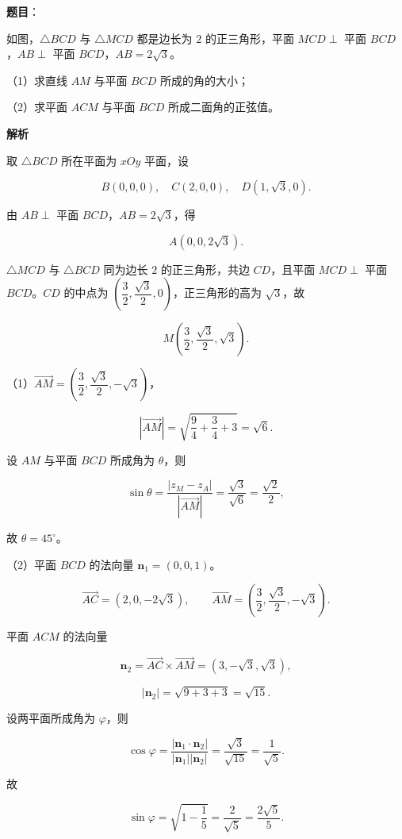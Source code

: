 \begin{answer}

\textbf{题目}：

如图，$\triangle BCD$ 与 $\triangle MCD$ 都是边长为 $2$ 的正三角形，平面 $MCD\perp$ 平面 $BCD$，$AB\perp$ 平面 $BCD$，$AB=2\sqrt3$。

（1）求直线 $AM$ 与平面 $BCD$ 所成的角的大小；

（2）求平面 $ACM$ 与平面 $BCD$ 所成二面角的正弦值。
\nopagebreak[4]
\begin{center}\end{center}
\nopagebreak[4]
\textbf{解析}

取 $\triangle BCD$ 所在平面为 $xOy$ 平面，设

\nopagebreak[4]
\[B(0,0,0),\quad C(2,0,0),\quad D(1,\sqrt3,0).\]

由 $AB\perp$ 平面 $BCD$，$AB=2\sqrt3$，得

\nopagebreak[4]
\[A(0,0,2\sqrt3).\]

$\triangle MCD$ 与 $\triangle BCD$ 同为边长 $2$ 的正三角形，共边 $CD$，且平面 $MCD\perp$ 平面 $BCD$。$CD$ 的中点为 $\left(\dfrac32,\dfrac{\sqrt3}2,0\right)$，正三角形的高为 $\sqrt3$，故

\nopagebreak[4]
\[M\left(\frac32,\frac{\sqrt3}2,\sqrt3\right).\]

（1）$\overrightarrow{AM}=\left(\dfrac32,\dfrac{\sqrt3}2,-\sqrt3\right)$，

\nopagebreak[4]
\[|\overrightarrow{AM}|=\sqrt{\frac94+\frac34+3}=\sqrt6.\]

设 $AM$ 与平面 $BCD$ 所成角为 $\theta$，则

\nopagebreak[4]
\[\sin\theta=\frac{|z_M-z_A|}{|\overrightarrow{AM}|}
=\frac{\sqrt3}{\sqrt6}=\frac{\sqrt2}2,\]

故 $\theta=45^\circ$。

（2）平面 $BCD$ 的法向量 $\boldsymbol n_1=(0,0,1)$。

\nopagebreak[4]
\[\overrightarrow{AC}=(2,0,-2\sqrt3),\qquad
\overrightarrow{AM}=\left(\frac32,\frac{\sqrt3}2,-\sqrt3\right).\]

平面 $ACM$ 的法向量

\nopagebreak[4]
\[\boldsymbol n_2=\overrightarrow{AC}\times\overrightarrow{AM}
=\left(3,-\sqrt3,\sqrt3\right),\]

\nopagebreak[4]
\[|\boldsymbol n_2|=\sqrt{9+3+3}=\sqrt{15}.\]

设两平面所成角为 $\varphi$，则

\nopagebreak[4]
\[\cos\varphi=\frac{|\boldsymbol n_1\cdot\boldsymbol n_2|}{|\boldsymbol n_1||\boldsymbol n_2|}
=\frac{\sqrt3}{\sqrt{15}}=\frac1{\sqrt5}.\]

故

\nopagebreak[4]
\[\sin\varphi=\sqrt{1-\frac15}=\frac2{\sqrt5}=\frac{2\sqrt5}5.\]


\end{answer}

